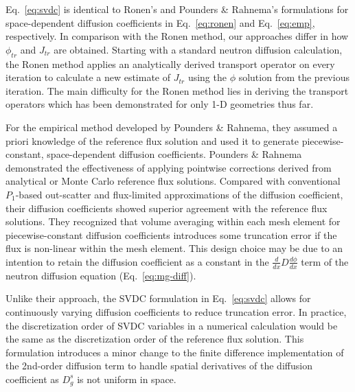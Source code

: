 Eq.\ \ref{eq:svdc} is identical to Ronen's \cite{ronen_accurate_2004} and Pounders \& Rahnema's
\cite{pounders_diffusion_2009} formulations for space-dependent diffusion coefficients in Eq.\
\ref{eq:ronen} and Eq.\ \ref{eq:emp}, respectively. In comparison with
the Ronen method, our approaches differ in how $\phi_{tr}$ and $J_{tr}$ are obtained. Starting with
a standard neutron diffusion calculation, the Ronen method applies an analytically derived
transport operator on every iteration to calculate a new estimate of $J_{tr}$ using the $\phi$
solution from the previous iteration. The main difficulty for the Ronen method lies in deriving the
transport operators which has been demonstrated for only 1-D geometries thus far.

For the empirical method developed by Pounders \& Rahnema, they assumed a priori knowledge of the
reference flux solution and used it to generate piecewise-constant, space-dependent diffusion
coefficients.
Pounders \& Rahnema \cite{pounders_diffusion_2009} demonstrated the effectiveness of applying
pointwise corrections derived from analytical or Monte Carlo reference flux solutions. Compared
with conventional $P_1$-based out-scatter and flux-limited approximations of the diffusion
coefficient, their diffusion coefficients showed superior agreement
with the reference flux solutions. They recognized that volume averaging within each mesh element
for piecewise-constant diffusion coefficients introduces some truncation error if the flux is
non-linear within the mesh element. This design choice may be due to an intention to retain the
diffusion coefficient as a constant in the $\frac{d}{dx}D\frac{d\phi}{dx}$ term of the neutron
diffusion equation (Eq.\ \ref{eq:mg-diff}).

Unlike their approach, the \gls{SVDC} formulation in Eq.\ \ref{eq:svdc} allows for continuously
varying diffusion coefficients to reduce truncation error. In practice, the discretization order of
\gls{SVDC} variables in a numerical calculation would be the same as the discretization order of
the reference flux solution. This formulation introduces a minor change to the finite difference
implementation of the 2nd-order diffusion term to handle spatial derivatives of the
diffusion coefficient as $D^s_g$ is not uniform in space.


